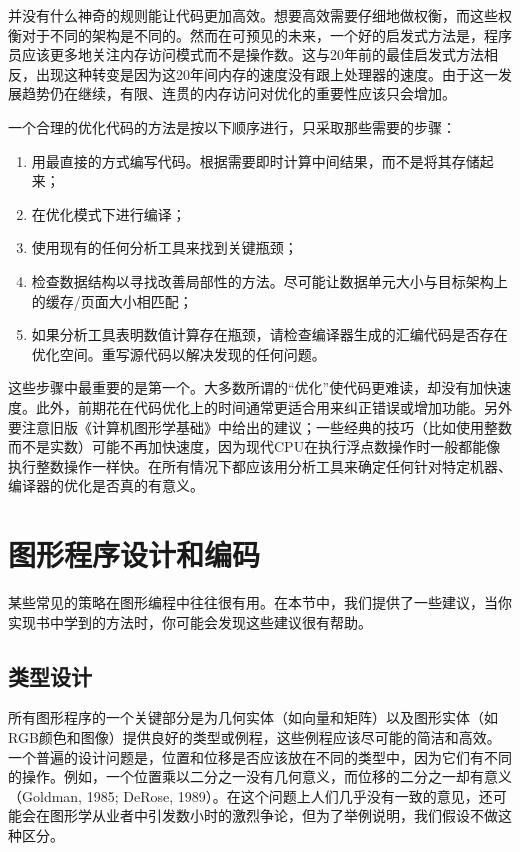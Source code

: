 \documentclass[lang=cn,12pt]{elegantbook}
\begin{document}
并没有什么神奇的规则能让代码更加高效。想要高效需要仔细地做权衡，而这些权衡对于不同的架构是不同的。然而在可预见的未来，一个好的启发式方法是，程序员应该更多地关注内存访问模式而不是操作数。这与20年前的最佳启发式方法相反，出现这种转变是因为这20年间内存的速度没有跟上处理器的速度。由于这一发展趋势仍在继续，有限、连贯的内存访问对优化的重要性应该只会增加。

一个合理的优化代码的方法是按以下顺序进行，只采取那些需要的步骤：

\begin{enumerate}
  \item 用最直接的方式编写代码。根据需要即时计算中间结果，而不是将其存储起来；
  \item 在优化模式下进行编译；
  \item 使用现有的任何分析工具来找到关键瓶颈；
  \item 检查数据结构以寻找改善局部性的方法。尽可能让数据单元大小与目标架构上的缓存/页面大小相匹配；
  \item 如果分析工具表明数值计算存在瓶颈，请检查编译器生成的汇编代码是否存在优化空间。重写源代码以解决发现的任何问题。
\end{enumerate}

这些步骤中最重要的是第一个。大多数所谓的“优化”使代码更难读，却没有加快速度。此外，前期花在代码优化上的时间通常更适合用来纠正错误或增加功能。另外要注意旧版《计算机图形学基础》中给出的建议；一些经典的技巧（比如使用整数而不是实数）可能不再加快速度，因为现代CPU在执行浮点数操作时一般都能像执行整数操作一样快。在所有情况下都应该用分析工具来确定任何针对特定机器、编译器的优化是否真的有意义。

\section{图形程序设计和编码}

某些常见的策略在图形编程中往往很有用。在本节中，我们提供了一些建议，当你实现书中学到的方法时，你可能会发现这些建议很有帮助。

\subsection{类型设计}

所有图形程序的一个关键部分是为几何实体（如向量和矩阵）以及图形实体（如RGB颜色和图像）提供良好的类型或例程，这些例程应该尽可能的简洁和高效。一个普遍的设计问题是，位置和位移是否应该放在不同的类型中，因为它们有不同的操作。例如，一个位置乘以二分之一没有几何意义，而位移的二分之一却有意义（Goldman, 1985; DeRose, 1989）。在这个问题上人们几乎没有一致的意见，还可能会在图形学从业者中引发数小时的激烈争论，但为了举例说明，我们假设不做这种区分。
\end{document}

